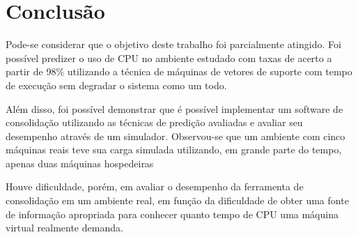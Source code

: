 \chapter{Conclusão}

Pode-se considerar que o objetivo deste trabalho foi parcialmente atingido. Foi
possível predizer o uso de CPU no ambiente estudado com taxas de acerto a
partir de 98\% utilizando a técnica de máquinas de vetores de suporte com tempo
de execução sem degradar o sistema como um todo.

Além disso, foi possível demonstrar que é possível implementar um software de
consolidação utilizando as técnicas de predição avaliadas e avaliar seu
desempenho através de um simulador. Observou-se que um ambiente com cinco
máquinas reais teve sua carga simulada utilizando, em grande parte do tempo,
apenas duas máquinas hospedeiras

Houve dificuldade, porém, em avaliar o desempenho da ferramenta de consolidação
em um ambiente real, em função da dificuldade de obter uma fonte de informação
apropriada para conhecer quanto tempo de CPU uma máquina virtual realmente
demanda.
